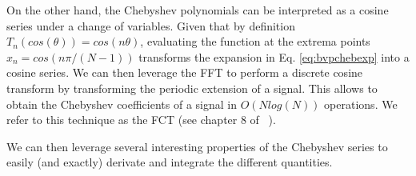 \documentclass[twoside,openright,titlepage,numbers=noenddot,%
headinclude,footinclude,cleardoublepage=empty,abstract=on,
BCOR=5mm,fontsize=11pt, dvipsnames, paper=b5
]{scrreprt}
\newcommand{\uammd}{\gls{UAMMD}\xspace}
\begin{document}
On the other hand, the Chebyshev polynomials can be interpreted as a cosine series under a change of variables. Given that by definition $T_n(cos(\theta))= cos(n\theta)$, evaluating the function at the extrema points $x_n = cos(n\pi/(N-1))$ transforms the expansion in Eq. \eqref{eq:bvpchebexp} into a cosine series. We can then leverage the \gls{FFT} to perform a discrete cosine transform by transforming the periodic extension of a signal. This allows to obtain the Chebyshev coefficients of a signal in $O(Nlog(N))$ operations. We refer to this technique as the \gls{FCT} (see chapter 8 of ~\cite{Trefethen2000}).

We can then leverage several interesting properties of the Chebyshev series to easily (and exactly) derivate and integrate the different quantities.

\end{document}
